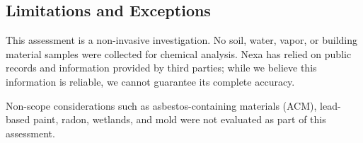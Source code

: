 \subsection{Limitations and Exceptions}
This assessment is a non-invasive investigation. No soil, water, vapor, or building material samples were collected for chemical analysis. Nexa has relied on public records and information provided by third parties; while we believe this information is reliable, we cannot guarantee its complete accuracy.

Non-scope considerations such as asbestos-containing materials (ACM), lead-based paint, radon, wetlands, and mold were not evaluated as part of this assessment.

